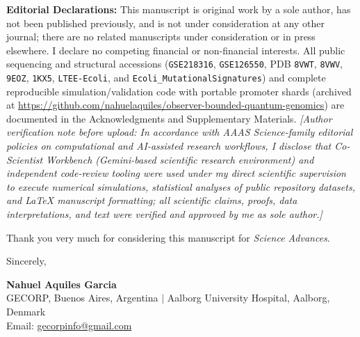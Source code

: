 \documentclass[11pt,letterpaper]{article}
\begin{document}
\textbf{Editorial Declarations:} This manuscript is original work by a sole author, has not been published previously, and is not under consideration at any other journal; there are no related manuscripts under consideration or in press elsewhere. I declare no competing financial or non-financial interests. All public sequencing and structural accessions (\texttt{GSE218316}, \texttt{GSE126550}, PDB \texttt{8VWT}, \texttt{8VWV}, \texttt{9EOZ}, \texttt{1KX5}, \texttt{LTEE-Ecoli}, and \texttt{Ecoli\_MutationalSignatures}) and complete reproducible simulation/validation code with portable promoter shards (archived at \url{https://github.com/nahuelaquiles/observer-bounded-quantum-genomics}) are documented in the Acknowledgments and Supplementary Materials. \textit{[Author verification note before upload: In accordance with AAAS Science-family editorial policies on computational and AI-assisted research workflows, I disclose that Co-Scientist Workbench (Gemini-based scientific research environment) and independent code-review tooling were used under my direct scientific supervision to execute numerical simulations, statistical analyses of public repository datasets, and LaTeX manuscript formatting; all scientific claims, proofs, data interpretations, and text were verified and approved by me as sole author.]}

Thank you very much for considering this manuscript for \textit{Science Advances}.

Sincerely,

\vspace{0.9em}
\noindent\textbf{Nahuel Aquiles Garcia}\\
GECORP, Buenos Aires, Argentina $\mid$ Aalborg University Hospital, Aalborg, Denmark\\
Email: \href{mailto:gecorpinfo@gmail.com}{gecorpinfo@gmail.com}
\end{document}
